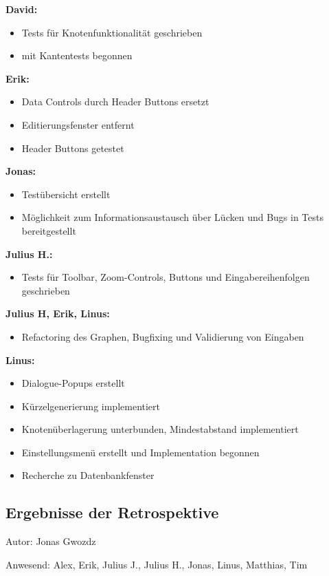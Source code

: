 \begin{itemize}
\textbf{David:}
\begin{itemize}
\item Tests für Knotenfunktionalität geschrieben
\item mit Kantentests begonnen
\end{itemize}

\textbf{Erik:}
\begin{itemize}
\item Data Controls durch Header Buttons ersetzt
\item Editierungsfenster entfernt
\item Header Buttons getestet
\end{itemize}

\textbf{Jonas:}
\begin{itemize}
\item Testübersicht erstellt
\item Möglichkeit zum Informationsaustausch über Lücken und Bugs in Tests bereitgestellt
\end{itemize}

\textbf{Julius H.:}
\begin{itemize}
\item Tests für Toolbar, Zoom-Controls, Buttons und Eingabereihenfolgen geschrieben
\end{itemize}

\textbf{Julius H, Erik, Linus:}
\begin{itemize}
\item Refactoring des Graphen, Bugfixing und Validierung von Eingaben
\end{itemize}

\textbf{Linus:}
\begin{itemize}
\item Dialogue-Popups erstellt
\item Kürzelgenerierung implementiert
\item Knotenüberlagerung unterbunden, Mindestabstand implementiert
\item Einstellungsmenü erstellt und Implementation begonnen
\item Recherche zu Datenbankfenster
\end{itemize}

\subsection{Ergebnisse der Retrospektive}
{\small Autor: Jonas Gwozdz}

Anwesend: Alex, Erik, Julius J., Julius H., Jonas, Linus, Matthias, Tim\\


\end{itemize}
